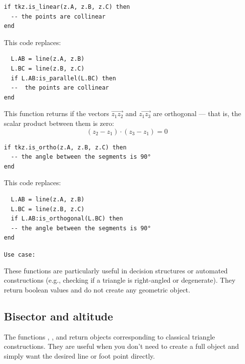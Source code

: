 \begin{mybox}
\begin{verbatim}
if tkz.is_linear(z.A, z.B, z.C) then
  -- the points are collinear
end
\end{verbatim}
\end{mybox}

This code replaces:

\begin{mybox}
\begin{verbatim}
  L.AB = line(z.A, z.B)
  L.BC = line(z.B, z.C)
  if L.AB:is_parallel(L.BC) then
  --  the points are collinear
end
\end{verbatim}
\end{mybox}

\medskip
\textbf{}
This function returns  if the vectors $\overrightarrow{z_1z_2}$ and $\overrightarrow{z_1z_3}$ are orthogonal — that is, the scalar product between them is zero:
\[
(z_2 - z_1) \cdot (z_3 - z_1) = 0
\]

\begin{mybox}
\begin{verbatim}
if tkz.is_ortho(z.A, z.B, z.C) then
  -- the angle between the segments is 90°
end
\end{verbatim}
\end{mybox}

This code replaces:

\begin{mybox}
\begin{verbatim}
  L.AB = line(z.A, z.B)
  L.BC = line(z.B, z.C)
  if L.AB:is_orthogonal(L.BC) then
  -- the angle between the segments is 90°
end
\end{verbatim}
\end{mybox}

\medskip
\texttt{Use case: }

These functions are particularly useful in decision structures or automated constructions (e.g., checking if a triangle is right-angled or degenerate). They return boolean values and do not create any geometric object.

\subsection{Bisector and altitude}
\label{sub:bisector_and_altitude}

The functions , , and  return  objects corresponding to classical triangle constructions. They are useful when you don't need to create a full  object and simply want the desired line or foot point directly.

